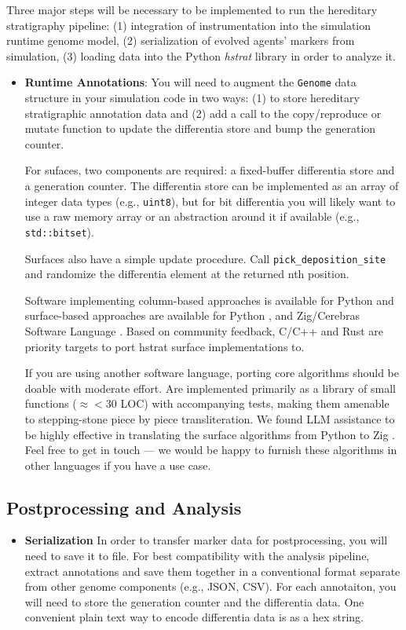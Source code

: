 \begin{enumerate}
Three major steps will be necessary to be implemented to run the hereditary stratigraphy pipeline: (1) integration of instrumentation into the simulation runtime genome model, (2) serialization of evolved agents' markers from simulation, (3) loading data into the Python \textit{hstrat} library in order to analyze it.

\begin{itemize}
\item \textbf{Runtime Annotations}:
You will need to augment the \texttt{Genome} data structure in your simulation code in two ways: (1) to store hereditary stratigraphic annotation data and (2) add a call to the copy/reproduce or mutate function to update the differentia store and bump the generation counter.

For sufaces, two components are required: a fixed-buffer differentia store and a generation counter.
The differentia store can be implemented as an array of integer data types (e.g., \texttt{uint8}), but for bit differentia you will likely want to use a raw memory array or an abstraction around it if available (e.g., \texttt{std::bitset}).

Surfaces also have a simple update procedure.
Call \texttt{pick\_deposition\_site} and randomize the differentia element at the returned nth position.

Software implementing column-based approaches is available for Python \citep{moreno2022hstrat} and surface-based approaches are available for Python \citep{TODO}, and Zig/Cerebras Software Language \citep{TODO}.
Based on community feedback, C/C++ and Rust are priority targets to port hstrat surface implementations to.

If you are using another software language, porting core algorithms should be doable with moderate effort.
Are implemented primarily as a library of small functions ($\approx<30$ LOC) with accompanying tests, making them amenable to stepping-stone piece by piece transliteration.
We found LLM assistance to be highly effective in translating the surface algorithms from Python to Zig \citep{TODO}.
Feel free to get in touch --- we would be happy to furnish these algorithms in other languages if you have a use case.
\end{itemize}

\subsection{Postprocessing and Analysis}
\begin{itemize}
\item \textbf{Serialization}
In order to transfer marker data for postprocessing, you will need to save it to file.
For best compatibility with the analysis pipeline, extract annotations and save them together in a conventional format separate from other genome components (e.g., JSON, CSV).
For each annotaiton, you will need to store the generation counter and the differentia data.
One convenient plain text way to encode differentia data is as a hex string.


\end{itemize}
\end{enumerate}
